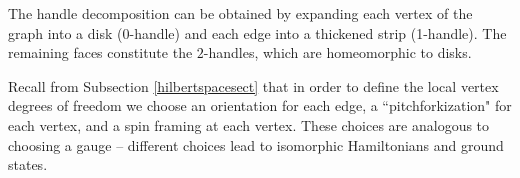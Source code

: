\documentclass[12pt,a4paper]{article}
\newcommand{\kw}[1]{{\color{kwcolor}\footnotesize{(KW) #1}}}
\newcommand{\dave}[1]{{\color{ao(english)}\footnotesize{(DA) #1}}}
\begin{document}
The handle decomposition can be obtained by expanding each vertex of the graph into a disk ($0$-handle) and each edge into
a thickened strip (1-handle).
The remaining faces constitute the $2$-handles, which are homeomorphic to disks.

Recall from Subsection \ref{hilbertspacesect} that 
in order to define the local vertex degrees of freedom we choose an orientation for each edge, a ``pitchforkization" for each vertex, and a spin framing at each vertex.
These choices are analogous to choosing a gauge -- different choices lead to isomorphic Hamiltonians and ground states.

\end{document}
